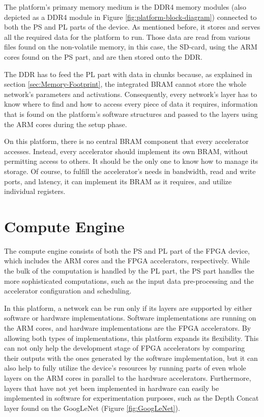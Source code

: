 The platform's primary memory medium is the DDR4 memory modules  (also depicted as a DDR4 module in Figure \ref{fig:platform-block-diagram}) connected to both the PS and PL parts of the device. As mentioned before, it stores and serves all the required data for the platform to run. Those data are read from various files found on the non-volatile memory, in this case, the SD-card, using the ARM cores found on the PS part, and are then stored onto the DDR.

The DDR has to feed the PL part with data in chunks because, as explained in section \ref{sec:Memory-Footprint}, the integrated BRAM cannot store the whole network's parameters and activations. Consequently, every network's layer has to know where to find and how to access every piece of data it requires, information that is found on the platform's software structures and passed to the layers using the ARM cores during the setup phase.

On this platform, there is no central BRAM component that every accelerator accesses. Instead, every accelerator should implement its own BRAM, without permitting access to others. It should be the only one to know how to manage its storage. Of course, to fulfill the accelerator's needs in bandwidth, read and write ports, and latency, it can implement its BRAM as it requires, and utilize individual registers.

\section{Compute Engine}
The compute engine consists of both the PS and PL part of the FPGA device, which includes the ARM cores and the FPGA accelerators, respectively. While the bulk of the computation is handled by the PL part, the PS part handles the more sophisticated computations, such as the input data pre-processing and the accelerator configuration and scheduling.

In this platform, a network can be run only if its layers are supported by either software or hardware implementations. Software implementations are running on the ARM cores, and hardware implementations are the FPGA accelerators. By allowing both types of implementations, this platform expands its flexibility. This can not only help the development stage of FPGA accelerators by comparing their outputs with the ones generated by the software implementation, but it can also help to fully utilize the device's resources by running parts of even whole layers on the ARM cores in parallel to the hardware accelerators. Furthermore, layers that have not yet been implemented in hardware can easily be implemented in software for experimentation purposes, such as the Depth Concat layer found on the GoogLeNet (Figure \ref{fig:GoogLeNet}).

